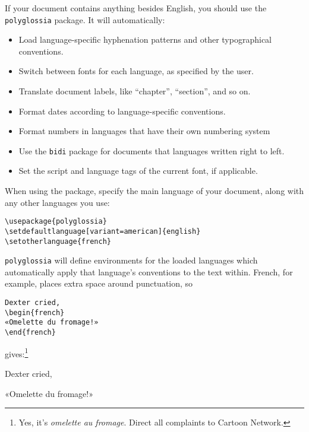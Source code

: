 If your document contains anything besides English,
you should use the \texttt{polyglossia} package.
It will automatically:
\begin{itemize}
\item Load language-specific hyphenation patterns and other typographical
    conventions.
\item Switch between fonts for each language, as specified by the user.
\item Translate document labels,
    like ``chapter''\quotekern, ``section''\quotekern, and so on.
\item Format dates according to language-specific conventions.
\item Format numbers in languages that have their own numbering system
\item Use the \texttt{bidi} package for documents that languages written
    right to left.
\item Set the script and language tags of the current font, if applicable.
\end{itemize}
When using the package, specify the main language of your document,
along with any other languages you use:
\begin{leftfigure}
\begin{lstlisting}
\usepackage{polyglossia}
\setdefaultlanguage[variant=american]{english}
\setotherlanguage{french}
\end{lstlisting}
\end{leftfigure}
\texttt{polyglossia} will define environments for the loaded languages
which automatically apply that language's conventions to the text
within.
French, for example, places extra space around punctuation, so
\begin{leftfigure}
\begin{lstlisting}
Dexter cried,
\begin{french}
«Omelette du fromage!»
\end{french}
\end{lstlisting}
\end{leftfigure}
gives:\footnote{Yes, it's \emph{omelette au fromage}.
Direct all complaints to Cartoon Network.}
\begin{leftfigure}
Dexter cried,
\begin{french}
«Omelette du fromage!»
\end{french}
\end{leftfigure}


